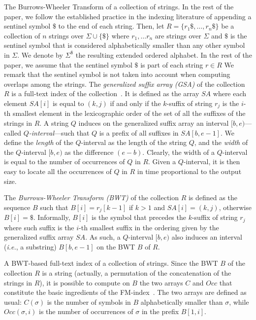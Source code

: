 \documentclass[runningheads,envcountsame,a4paper]{llncs}
\makeatletter
\newcommand{\paragrafo}{%
  \@startsection{paragraph}{4}{\z@ }{-7\p@ \@plus -4\p@ \@minus -4\p@
  }{-0.5em \@plus -0.22em \@minus -0.1em}{\normalfont \normalsize \itshape
  }
}
\newcommand{\ie}{\textit{i.e.}\xspace}
\newcommand{\SA}{\ensuremath{\textit{SA}}}
\newcommand{\Occ}{\ensuremath{\textit{Occ}}}
\makeatother
\begin{document}
\paragrafo{The Burrows-Wheeler Transform of a collection of strings.}
In the rest of the paper, we follow the established practice in the
indexing literature of appending a sentinel symbol $\$$ to the end of
each string.
Then, let $R = \{r_1\$, \dots, r_n\$ \}$ be a collection of $n$ strings
over $\Sigma \cup \{ \$ \}$ where $r_1, \dots r_n$ are strings over
$\Sigma$ and $\$$ is the sentinel symbol that is considered
alphabetically smaller than any other symbol in $\Sigma$.
We denote by $\Sigma^\$$ the resulting extended ordered alphabet.
In the rest of the paper, we assume that the sentinel symbol $\$$ is
part of each string $r \in R$ We remark that the sentinel symbol is not taken into account when
computing overlaps among the strings.
The \emph{generalized suffix array (GSA)} of the collection $R$ is a
full-text index of the collection~\cite{Shi1996}.
It is defined as the array $\SA$ where each element $\SA[i]$ is
equal to $(k, j)$ if and only if the $k$-suffix of string $r_{j}$ is the
$i$-th smallest element in the lexicographic order of the set of all the
suffixes of the strings in $R$.
A string $Q$ induces on the generalized suffix array an interval $[b,
e)$---called \emph{$Q$-interval}---such that $Q$ is a prefix of all
suffixes in $\SA[b, e-1]$.
We define the \emph{length} of the $Q$-interval as the length of the
string $Q$, and the \emph{width} of the $Q$-interval $[b, e)$ as the
difference $(e-b)$.
Clearly, the width of a $Q$-interval is equal to the number of
occurrences of $Q$ in $R$.
Given a $Q$-interval, it is then easy to locate all the occurrences of
$Q$ in $R$ in time proportional to the output size.

The \emph{Burrows-Wheeler Transform (BWT)} of the collection $R$ is
defined as the sequence $B$ such that $B[i]=r_{j}[k -1]$ if $k > 1$
and $\SA[i] = (k,j)$, otherwise $B[i]= \$$.
Informally, $B[i]$ is the symbol that precedes the $k$-suffix of
string $r_j$ where such suffix is the $i$-th smallest suffix in the
ordering given by the generalized suffix array $\SA$.
As such, a $Q$-interval $[b, e)$ also induces an interval (\ie, a
substring) $B[b, e-1]$ on the BWT $B$ of $R$.

\paragrafo{A BWT-based full-text index of a collection of strings.}
Since the BWT $B$ of the collection $R$ is a string (actually, a
permutation of the concatenation of the strings in $R$), it is possible
to compute on $B$ the two arrays $C$ and $\Occ$ that constitute the
basic ingredients of the FM-index~\cite{Ferragina2005}.
The two arrays are defined as usual: $C(\sigma)$ is the number of
symbols in $B$ alphabetically smaller than $\sigma$, while $\Occ(\sigma,
i)$ is the number of occurrences of $\sigma$ in the prefix $B[1, i]$.
\end{document}
